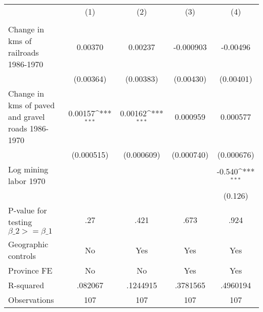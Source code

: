 {
\def\sym#1{\ifmmode^{#1}\else\(^{#1}\)\fi}
\begin{tabular}{l*{4}{c}}
\hline\hline
                &\multicolumn{1}{c}{(1)}&\multicolumn{1}{c}{(2)}&\multicolumn{1}{c}{(3)}&\multicolumn{1}{c}{(4)}\\
                &\multicolumn{1}{c}{}&\multicolumn{1}{c}{}&\multicolumn{1}{c}{}&\multicolumn{1}{c}{}\\
\hline
Change in kms of railroads 1986-1970&  0.00370         &  0.00237         &-0.000903         & -0.00496         \\
                &(0.00364)         &(0.00383)         &(0.00430)         &(0.00401)         \\
[1em]
Change in kms of paved and gravel roads 1986-1970&  0.00157\sym{***}&  0.00162\sym{***}& 0.000959         & 0.000577         \\
                &(0.000515)         &(0.000609)         &(0.000740)         &(0.000676)         \\
[1em]
Log mining labor 1970&                  &                  &                  &   -0.540\sym{***}\\
                &                  &                  &                  &  (0.126)         \\
\hline
P-value for testing $\beta\_{2} >= \beta\_{1}$&      .27         &     .421         &     .673         &     .924         \\
Geographic controls&       No         &      Yes         &      Yes         &      Yes         \\
Province FE     &       No         &       No         &      Yes         &      Yes         \\
R-squared       &  .082067         & .1244915         & .3781565         & .4960194         \\
Observations    &      107         &      107         &      107         &      107         \\
\hline\hline
\end{tabular}
}
